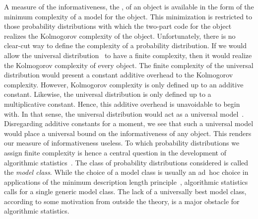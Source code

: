 A measure of the informativeness, the , of an object is available in the form of the minimum complexity of a model for the object.
This minimization is restricted to those probability distributions with which the two-part code for the object realizes the Kolmogorov complexity of the object.
Unfortunately, there is no clear-cut way to define the complexity of a probability distribution.
If we would allow the universal distribution~\parencite{li2008introduction} to have a finite complexity, then it would realize the Kolmogorov complexity of every object.
The finite complexity of the universal distribution would present a constant additive overhead to the Kolmogorov complexity.
However, Kolmogorov complexity is only defined up to an additive constant.
Likewise, the universal distribution is only defined up to a multiplicative constant.
Hence, this additive overhead is unavoidable to begin with.
In that sense, the universal distribution would act as a universal model~\parencite{vitanyi2006meaningful,bloem2015two}.
Disregarding additive constants for a moment, we see that such a universal model would place a universal bound on the informativeness of any object.
This renders our measure of informativeness useless.
To which probability distributions we assign finite complexity is hence a central question in the development of algorithmic statistics~\parencite{vereshchagin2017algorithmic}.
The class of probability distributions considered is called the \emph{model class}.
While the choice of a model class is usually an ad~hoc choice in applications of the minimum description length principle~\parencite{vitanyi2000minimum,grunwald2007minimum}, algorithmic statistics calls for a single generic model class.
The lack of a universally best model class, according to some motivation from outside the theory, is a major obstacle for algorithmic statistics.

